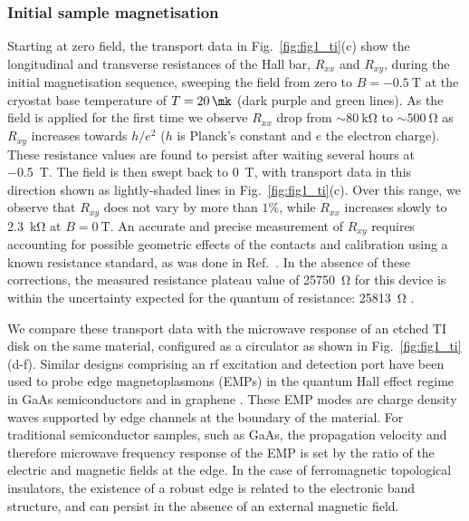 \subsubsection{Initial sample magnetisation} Starting at zero field, the transport data in Fig.~\ref{fig:fig1_ti}(c) show the longitudinal and transverse resistances of the Hall bar, $R_{xx}$ and $R_{xy}$, during the initial magnetisation sequence, sweeping the field from zero to $B = \SI{-0.5}{\tesla}$ at the cryostat base temperature of $T = \SI{20}{\mk}$ (dark purple and green lines). As the field is applied for the first time we observe $R_{xx}$ drop from $\sim \SI{80}{\kilo\ohm}$ to $\sim \SI{500}{\ohm}$ as $R_{xy}$ increases towards $h/e^2$ ($h$ is Planck's constant and $e$ the electron charge). These resistance values are found to persist after waiting several hours at \SI{-0.5}{\tesla}. The field is then swept back to \SI{0}{\tesla}, with transport data in this direction shown as lightly-shaded lines in Fig.~\ref{fig:fig1_ti}(c). Over this range, we observe that $R_{xy}$ does not vary by more than $1\%$, while $R_{xx}$ increases slowly to \SI{2.3}{\kilo\ohm} at $B = \SI{0}{\tesla}$. An accurate and precise measurement of $R_{xy}$ requires accounting for possible geometric effects of the contacts and calibration using a known resistance standard, as was done in Ref.~\cite{bestwick2015precise}. In the absence of these corrections, the measured resistance plateau value of \SI{25750}{\ohm} for this device is within the uncertainty expected for the quantum of resistance: \SI{25813}{\ohm} \cite{chang2013experimental, kou2014scale, checkelsky2014trajectory}.

We compare these transport data with the microwave response of an etched TI disk on the same material, configured as a circulator as shown in Fig.~\ref{fig:fig1_ti}(d-f). Similar designs comprising an rf excitation and detection port have been used to probe edge magnetoplasmons (EMPs) in the quantum Hall effect regime in GaAs semiconductors \cite{kamata2010voltage,kumada2011edge, mahoney2016chip} and in graphene \cite{petkovic2013carrier, kumada2013plasmon, kumada2014resonant}. These EMP modes are charge density waves supported by edge channels at the boundary of the material. For traditional semiconductor samples, such as GaAs, the propagation velocity and therefore microwave frequency response of the EMP is set by the ratio of the electric and magnetic fields at the edge. In the case of ferromagnetic topological insulators, the existence of a robust edge is related to the electronic band structure, and can persist in the absence of an external magnetic field.

